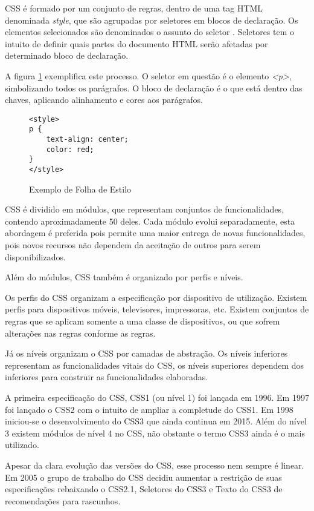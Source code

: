 CSS é formado por um conjunto de regras, dentro de uma tag HTML
denominada \textit{style}, que são agrupadas por seletores em blocos
de declaração. Os elementos selecionados são denominados o assunto
do seletor \autocite{cssSelectors}. Seletores tem o intuito de definir
quais partes do documento HTML serão afetadas por determinado bloco de
declaração.

A figura \ref{fig:CSSSample} exemplifica este processo. O seletor em
questão é o elemento \textit{<p>}, simbolizando todos os parágrafos. O bloco de
declaração é o que está dentro das chaves, aplicando alinhamento e
cores aos parágrafos.

\begin{figure}
\centering
\begin{verbatim}
<style>
p {
    text-align: center;
    color: red;
}
</style>
\end{verbatim}
\caption{Exemplo de Folha de Estilo}
\label{fig:CSSSample}
\end{figure}

CSS é dividido em módulos, que representam conjuntos de
funcionalidades, contendo aproximadamente 50 deles. Cada módulo evolui
separadamente, esta abordagem é preferida pois permite uma maior
entrega de novas funcionalidades, pois novos recursos não dependem da
aceitação de outros para serem disponibilizados.

Além do módulos, CSS também é organizado por perfis e níveis. 

Os perfis do CSS organizam a especificação por dispositivo de utilização.
Existem perfis para dispositivos móveis, televisores, impressoras, etc.
Existem conjuntos de regras que se aplicam somente a uma classe de dispositivos,
ou que sofrem alterações nas regras conforme as regras.

Já os níveis organizam o CSS por camadas de abstração. Os níveis
inferiores representam as funcionalidades vitais do CSS, os níveis
superiores dependem dos inferiores para construir as funcionalidades
elaboradas.

A primeira especificação do CSS, CSS1 (ou nível 1) foi lançada em
1996. Em 1997 foi lançado o CSS2 com o intuito de ampliar a completude
do CSS1. Em 1998 iniciou-se o desenvolvimento do CSS3 que ainda continua
em 2015. Além do nível 3 existem módulos de nível 4 no CSS, não
obstante o termo CSS3 ainda é o mais utilizado.

Apesar da clara evolução das versões do CSS, esse processo nem
sempre é linear. Em 2005 o grupo de trabalho do CSS decidiu aumentar a
restrição de suas especificações rebaixando o CSS2.1, Seletores do
CSS3 e Texto do CSS3 de recomendações para rascunhos.

